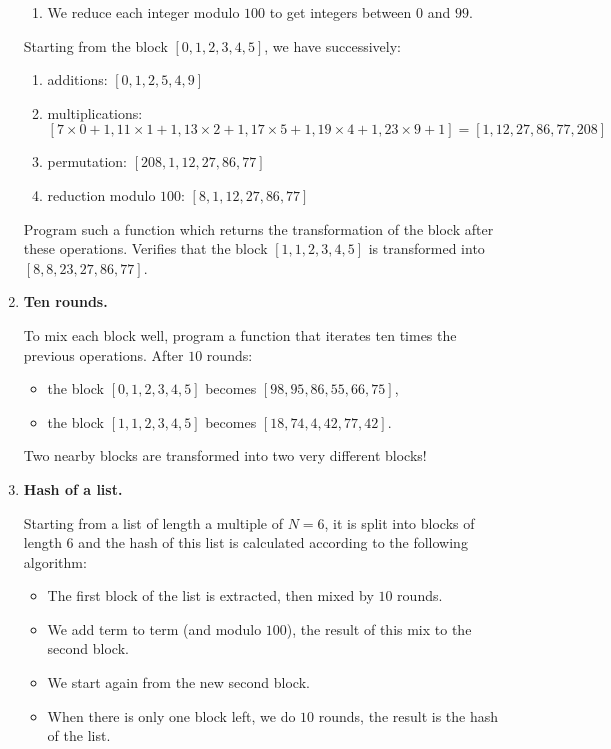 \documentclass[11pt,class=report,crop=false]{standalone}
\begin{document}
\begin{activite}
\begin{enumerate}
\begin{enumerate}
    \item We reduce each integer modulo $100$ to get integers between $0$ and $99$.
  \end{enumerate}



  
  Starting from the block $[0, 1, 2, 3, 4, 5]$, we have successively:
   \begin{enumerate}
    \item additions: $[0, 1, 2, 5, 4, 9]$
    
    \item multiplications: $[7\times 0 + 1, 11\times 1+1, 13\times 2+1, 17 \times 5+1,19 \times  4+1, 23 \times 9+1] = [1,12,27,86,77,208]$ 
    
    \item permutation: $[208,1,12,27,86,77]$
    
    \item reduction modulo $100$: $[8,1,12,27,86,77]$
  \end{enumerate}
  
  Program such a function  which returns the transformation of the block after these operations. Verifies that the block $[1, 1, 2, 3, 4, 5]$ is transformed into $[8, 8, 23, 27, 86, 77]$.
 
    \item \textbf{Ten rounds.} 
    
    To mix each block well, program a  function that iterates ten times the previous operations.
    After $10$ rounds:
    \begin{itemize}
      \item the block $[0, 1, 2, 3, 4, 5]$ becomes $[98, 95, 86, 55, 66, 75]$,
      \item the block $[1, 1, 2, 3, 4, 5]$ becomes $[18, 74, 4, 42, 77, 42]$.
    \end{itemize}
 Two nearby blocks are transformed into two very different blocks! 
   
   \item \textbf{Hash of a list.} 
   
   Starting from a list of length a multiple of $N=6$, it is split into blocks of length $6$ and the hash of this list is calculated according to the following algorithm:
   \begin{itemize}
     \item The first block of the list is extracted, then mixed by $10$ rounds.
     \item We add term to term (and modulo $100$), the result of this mix to the second block.
     \item We start again from the new second block.
     \item When there is only one block left, we do $10$ rounds, the result is the hash of the list.
   \end{itemize}
 

\end{enumerate}
\end{activite}
\end{document}
